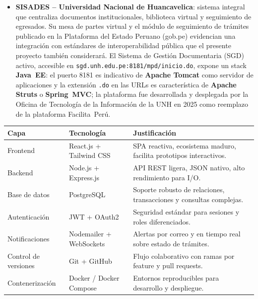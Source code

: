 \begin{itemize}
  \item \textbf{SISADES -- Universidad Nacional de Huancavelica}: sistema
    integral que centraliza documentos institucionales, biblioteca virtual y
    seguimiento de egresados. Su mesa de partes virtual y el módulo de
    seguimiento de trámites publicado en la Plataforma del Estado Peruano
    (gob.pe) evidencian una integración con estándares de interoperabilidad
    pública que el presente proyecto también considerará.
    El Sistema de Gestión Documentaria (SGD) activo,
    accesible en \texttt{sgd.unh.edu.pe:8181/mpd/inicio.do}, expone un stack
    \textbf{Java~EE}: el puerto 8181 es indicativo de \textbf{Apache Tomcat}
    como servidor de aplicaciones y la extensión \texttt{.do} en las URLs es
    característica de \textbf{Apache Struts} o \textbf{Spring~MVC}; la
    plataforma fue desarrollada y desplegada por la Oficina de Tecnología
    de la Información de la UNH en 2025 como reemplazo de la plataforma
    Facilita~Perú.
\end{itemize}

\begin{center}
\begin{tabular}{p{3.8cm} p{4.2cm} p{5cm}}
  \toprule
  \rowcolor{unsaacRed}
  \color{white}\textbf{Capa} & \color{white}\textbf{Tecnología} &
  \color{white}\textbf{Justificación} \\
  \midrule
  Frontend        & React.js + Tailwind CSS  & SPA reactiva, ecosistema maduro,
                                               facilita prototipos interactivos. \\
  Backend         & Node.js + Express.js     & API REST ligera, JSON nativo,
                                               alto rendimiento para I/O. \\
  Base de datos   & PostgreSQL               & Soporte robusto de relaciones,
                                               transacciones y consultas complejas. \\
  Autenticación   & JWT + OAuth2             & Seguridad estándar para sesiones
                                               y roles diferenciados. \\
  Notificaciones  & Nodemailer + WebSockets  & Alertas por correo y en tiempo
                                               real sobre estado de trámites. \\
  Control de versiones & Git + GitHub        & Flujo colaborativo con ramas por
                                               feature y pull requests. \\
  Contenerización & Docker / Docker Compose  & Entornos reproducibles para
                                               desarrollo y despliegue. \\
  \bottomrule
\end{tabular}
\end{center}

